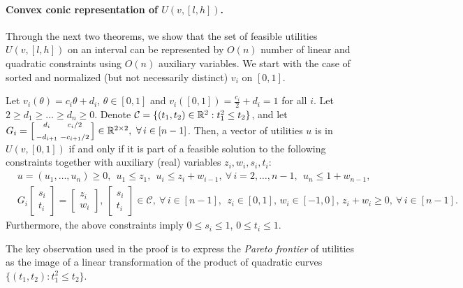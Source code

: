 \paragraph{Convex conic representation of $U(v,[l,h])$.} 
Through the next two theorems, we show that the set of feasible utilities $U(v, [l,h])$ on an interval can be represented by $O(n)$ number of linear and quadratic constraints using $O(n)$ auxiliary variables.
We start with the case of sorted and normalized (but not necessarily distinct) $v_i$ on $[0,1]$.
\begin{theorem}
	Let $v_i(\theta) = c_i \theta + d_i$, $\theta\in [0,1]$ and $v_i([0,1]) = \frac{c_i}{2}+d_i = 1$ for all $i$. 
	Let $2\geq d_1 \geq \dots \geq d_n \geq 0$. 
	Denote $\mathcal{C} = \{ (t_1,t_2)\in \mathbb{R}^2: t_1^2 \leq t_2 \}$, and let
	$G_i = \left[ \begin{smallmatrix}
		d_i & c_i / 2 \\[1ex]
		-d_{i+1} & -c_{i+1}/2
 	\end{smallmatrix}\right]\in \mathbb{R}^{2\times 2},\ \forall\, i\in [n-1]$.
	Then, a vector of utilities $u$ is in $U(v, [0,1])$ if and only if it is part of a feasible solution to the following constraints together with auxiliary (real) variables $z_i, w_i, s_i, t_i$:
	\begin{align*}
		& u = (u_1, \dots, u_n) \geq 0, \ \ u_1 \leq z_1, \ \ u_i \leq z_i + w_{i-1},\ \forall\, i=2, \dots, n-1,\ \ u_n \leq 1 + w_{n-1},\\
		& G_i \begin{bmatrix}
			s_i \\ t_i
		\end{bmatrix} = \begin{bmatrix}
			z_i \\ w_i
		\end{bmatrix}, \, \begin{bmatrix}
			s_i \\ t_i
		\end{bmatrix} \in \mathcal{C},\ \forall\, i \in [n-1],\ \ z_i \in [0,1],\, w_i \in [-1,0],\, z_i + w_i \geq 0,\ \forall\, i\in [n-1].
	\end{align*} 
	Furthermore, the above constraints imply $0\leq s_i \leq 1$, $0\leq t_i \leq 1$.
	\label{thm:U-conic-rep}
\end{theorem}
The key observation used in the proof is to express the \emph{Pareto frontier} of utilities as the image of a linear transformation of the product of quadratic curves $\{(t_1, t_2): t_1^2 \leq t_2\}$.
